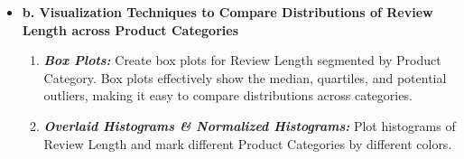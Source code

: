 \documentclass[12pt]{article}
\begin{document}
\begin{itemize}
			\item \textbf{b. Visualization Techniques to Compare Distributions of Review Length across Product Categories}

			\begin{enumerate}
				\item \emph{\textbf{Box Plots:}} Create box plots for Review Length segmented by Product Category. Box plots effectively show the median, quartiles, and potential outliers, making it easy to compare distributions across categories.
			
				\item \emph{\textbf{Overlaid Histograms \& Normalized Histograms:}} Plot histograms of Review Length and mark different Product Categories by different colors.
			\end{enumerate}			
		\end{itemize}
\end{document}
